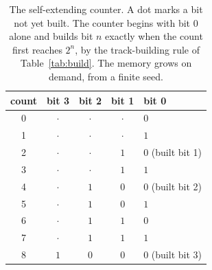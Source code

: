 \begin{table}[ht]
\centering
\begin{tabular}{@{}ccccl@{}}
\toprule
count & bit 3 & bit 2 & bit 1 & bit 0 \\
\midrule
0 & $\cdot$ & $\cdot$ & $\cdot$ & $0$ \\
1 & $\cdot$ & $\cdot$ & $\cdot$ & $1$ \\
2 & $\cdot$ & $\cdot$ & $1$ & $0$ \quad (built bit 1) \\
3 & $\cdot$ & $\cdot$ & $1$ & $1$ \\
4 & $\cdot$ & $1$ & $0$ & $0$ \quad (built bit 2) \\
5 & $\cdot$ & $1$ & $0$ & $1$ \\
6 & $\cdot$ & $1$ & $1$ & $0$ \\
7 & $\cdot$ & $1$ & $1$ & $1$ \\
8 & $1$ & $0$ & $0$ & $0$ \quad (built bit 3) \\
\bottomrule
\end{tabular}
\caption{The self-extending counter. A dot marks a bit not yet built. The counter begins with bit 0 alone and
builds bit $n$ exactly when the count first reaches $2^n$, by the track-building rule of Table~\ref{tab:build}.
The memory grows on demand, from a finite seed.}
\label{tab:counter-trace}
\end{table}
